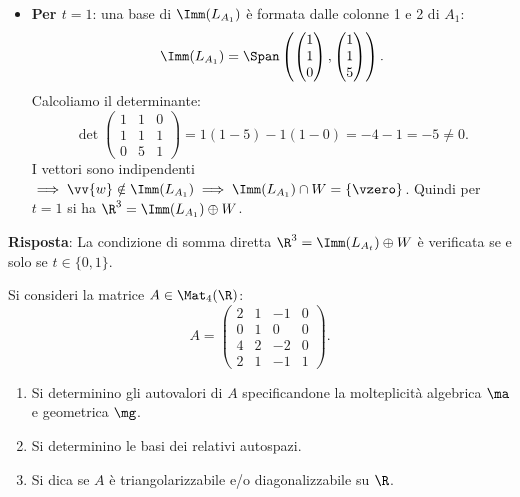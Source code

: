 \begin{dimostrazione}
\begin{itemize}
    \item \textbf{Per $t = 1$}: una base di $\Imm(L_{A_1})$ è formata dalle colonne 1 e 2 di $A_1$:
    \begin{equation}
        \Imm(L_{A_1}) = \Span\left( \begin{pmatrix} 1 \\ 1 \\ 0 \end{pmatrix}, \begin{pmatrix} 1 \\ 1 \\ 5 \end{pmatrix} \right).
    \end{equation}
    Calcoliamo il determinante:
    \begin{equation}
        \det \begin{pmatrix} 1 & 1 & 0 \\ 1 & 1 & 1 \\ 0 & 5 & 1 \end{pmatrix} = 1(1 - 5) - 1(1 - 0) = -4 - 1 = -5 \neq 0.
    \end{equation}
    I vettori sono indipendenti $\implies \vv{w} \notin \Imm(L_{A_1}) \implies \Imm(L_{A_1}) \cap W = \{\vzero\}$.
    Quindi per $t = 1$ si ha $\R^3 = \Imm(L_{A_1}) \oplus W$.
\end{itemize}
\textbf{Risposta}: La condizione di somma diretta $\R^3 = \Imm(L_{A_t}) \oplus W$ è verificata se e solo se $t \in \{0, 1\}$.
\end{dimostrazione}

\begin{tcolorbox}[colback=white, colframe=navyblue, title={\textbf{Testo del Problema 3 — Autovalori, Autospazi e Diagonalizzabilità}}]
Si consideri la matrice $A \in \Mat_4(\R)$:
\begin{equation}
    A = \begin{pmatrix}
        2 & 1 & -1 & 0 \\
        0 & 1 & 0 & 0 \\
        4 & 2 & -2 & 0 \\
        2 & 1 & -1 & 1
    \end{pmatrix}.
\end{equation}
\begin{enumerate}[label=(\roman*)]
    \item Si determinino gli autovalori di $A$ specificandone la molteplicità algebrica $\ma$ e geometrica $\mg$.
    \item Si determinino le basi dei relativi autospazi.
    \item Si dica se $A$ è triangolarizzabile e/o diagonalizzabile su $\R$.
\end{enumerate}
\end{tcolorbox}

